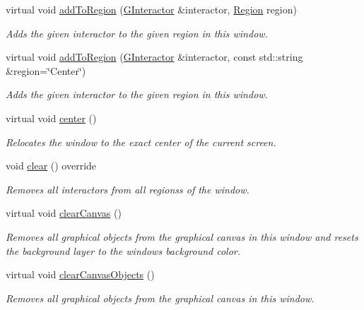 \begin{DoxyCompactItemize}
virtual void \mbox{\hyperlink{classGWindow_ad05df0d92ab2fba95d401a5614365558}{add\+To\+Region}} (\mbox{\hyperlink{classGInteractor}{G\+Interactor}} \&interactor, \mbox{\hyperlink{classGWindow_a81a01a86de31071a92e6cce0bab9bc4b}{Region}} region)
\begin{DoxyCompactList}\small\item\em Adds the given interactor to the given region in this window. \end{DoxyCompactList}\item 
virtual void \mbox{\hyperlink{classGWindow_a667ed0065e0bbb52a893904e7f2383bb}{add\+To\+Region}} (\mbox{\hyperlink{classGInteractor}{G\+Interactor}} \&interactor, const std\+::string \&region=\char`\"{}Center\char`\"{})
\begin{DoxyCompactList}\small\item\em Adds the given interactor to the given region in this window. \end{DoxyCompactList}\item 
virtual void \mbox{\hyperlink{classGWindow_a5013a22e5b1f902226b7394353f884ff}{center}} ()
\begin{DoxyCompactList}\small\item\em Relocates the window to the exact center of the current screen. \end{DoxyCompactList}\item 
void \mbox{\hyperlink{classGWindow_aee7cb2065b88d21ac4ad05bc997ecf82}{clear}} () override
\begin{DoxyCompactList}\small\item\em Removes all interactors from all regionss of the window. \end{DoxyCompactList}\item 
virtual void \mbox{\hyperlink{classGWindow_a8c64b6dc10f111538780ddca425a1693}{clear\+Canvas}} ()
\begin{DoxyCompactList}\small\item\em Removes all graphical objects from the graphical canvas in this window and resets the background layer to the window\textquotesingle{}s background color. \end{DoxyCompactList}\item 
virtual void \mbox{\hyperlink{classGWindow_a7d6e3e87568ed9962d29a0c9337c4b87}{clear\+Canvas\+Objects}} ()
\begin{DoxyCompactList}\small\item\em Removes all graphical objects from the graphical canvas in this window. \end{DoxyCompactList}\item 

\end{DoxyCompactItemize}
